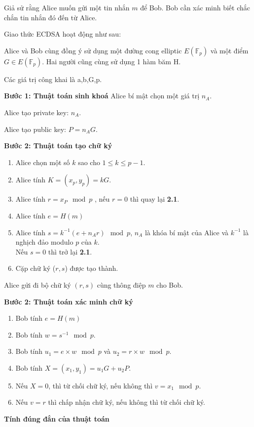 Giả sử rằng Alice muốn gửi một tin nhắn $m$ để Bob. Bob cần xác minh biết chắc chắn tin nhắn đó đến từ Alice. 

Giao thức ECDSA hoạt động như sau:

Alice và Bob cùng đồng ý sử dụng một đường cong elliptic $E (\mathbb{F}_p)$ và một điểm $G \in E (\mathbb{F}_p)$.
Hai người cũng cùng sử dụng 1 hàm băm H.

Các giá trị công khai là a,b,G,p.

\textbf{Bước 1: Thuật toán sinh khoá} 
Alice bí mật chọn một giá trị $n_A$.

Alice tạo private key: $n_A$.

Alice tạo public key: $P = n_AG$.

\textbf{Bước 2: Thuật toán tạo chữ ký} 
\begin{enumerate}

	\item Alice chọn một số $k$ sao cho $1 \le k \le p-1$.
	\item Alice tính $K = (x_p, y_p) =  kG$.
	\item Alice tính $r =  x_P \mod p$ , nếu $r = 0$ thì quay lại\textbf{ 2.1}.
	\item Alice tính $e = H(m)$
	\item Alice tính $s = k^{-1}(e+ n_A r)\mod p$, $n_A$ là khóa bí mật của Alice và $k^{-1}$ là nghịch đảo modulo $p$ của $k$.\\
	      Nếu $s = 0$ thì trở lại \textbf{2.1}.                          
	\item  Cặp  chữ ký ($r, s$) được tạo thành.
\end{enumerate}
Alice gửi đi bộ chữ ký $(r,s)$ cùng thông điệp $m$ cho Bob.

\textbf{Bước 2: Thuật toán xác minh chữ ký} 
\begin{enumerate}

	\item Bob tính $e = H(m)$
	\item Bob tính $ w = s^{-1} \mod p$.
	\item Bob tính $u_1 =  e \times w \mod p$ và $u_2 =  r \times w \mod p$.
	\item Bob tính $X =(x_1,y_1)= u_1G + u_2P$.
	\item Nếu $X = 0$, thì từ chối chữ ký, nếu không thì $v = x_1 \mod p$.
	\item Nếu $v=r$ thì chấp nhận chữ ký, nếu không thì từ chối chữ ký.
\end{enumerate}

\textbf{Tính đúng đắn của thuật toán}

